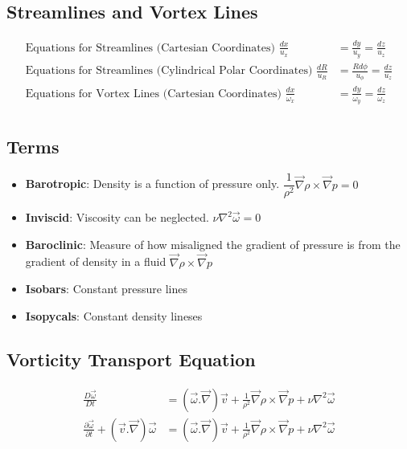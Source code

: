 \documentclass[11pt, letterpaper, notitlepage]{article}
\begin{document}
\subsection{Streamlines and Vortex Lines}
\begin{align*}
\text{Equations for Streamlines (Cartesian Coordinates) } \frac{dx}{u_x} &= \frac{dy}{u_y} = \frac{dz}{u_z} \\
\text{Equations for Streamlines (Cylindrical Polar Coordinates) } \frac{dR}{u_R} &= \frac{R d \phi}{u_\phi} = \frac{dz}{u_z} \\
\text{Equations for Vortex Lines (Cartesian Coordinates) } \frac{dx}{\omega_x} &= \frac{dy}{\omega_y} = \frac{dz}{\omega_z} \\
\end{align*}

\subsection{Terms}
\begin{itemize}
\item \textbf{Barotropic}: Density is a function of pressure only. $\dfrac{1}{\rho^2} \vec{\nabla} \rho \times \vec{\nabla} p = 0$ 
\item \textbf{Inviscid}: Viscosity can be neglected. $\nu \nabla^2 \vec{\omega} = 0$ 
\item \textbf{Baroclinic}: Measure of how misaligned the gradient of pressure is from the gradient of density in a fluid $\vec{\nabla} \rho \times \vec{\nabla} p$
\item \textbf{Isobars}: Constant pressure lines
\item \textbf{Isopycals}: Constant density lineses
\end{itemize}

\subsection{Vorticity Transport Equation}
\begin{align*}
\frac{D\vec{\omega}}{Dt} &= (\vec{\omega}.\vec{\nabla}) \vec{v} + \frac{1}{\rho^2} \vec{\nabla} \rho \times \vec{\nabla} p + \nu \nabla^2 \vec{\omega} \\
\frac{\partial \vec{\omega}}{\partial t} + (\vec{v}.\vec{\nabla})\vec{\omega} &= (\vec{\omega}.\vec{\nabla}) \vec{v} + \frac{1}{\rho^2} \vec{\nabla} \rho \times \vec{\nabla} p + \nu \nabla^2 \vec{\omega}
\end{align*}
\end{document}
